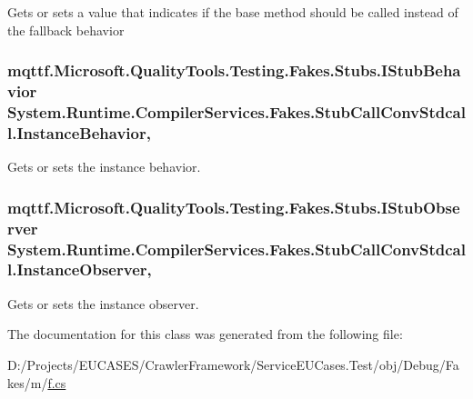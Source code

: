 Gets or sets a value that indicates if the base method should be called instead of the fallback behavior

\hypertarget{class_system_1_1_runtime_1_1_compiler_services_1_1_fakes_1_1_stub_call_conv_stdcall_a7f18e18bbdd66f56c6cda01beb3a7dd6}{
\subsubsection[{Instance\-Behavior}]{\setlength{\rightskip}{0pt plus 5cm}mqttf.\-Microsoft.\-Quality\-Tools.\-Testing.\-Fakes.\-Stubs.\-I\-Stub\-Behavior System.\-Runtime.\-Compiler\-Services.\-Fakes.\-Stub\-Call\-Conv\-Stdcall.\-Instance\-Behavior\hspace{0.3cm}{\ttfamily [get]}, {\ttfamily [set]}}}\label{class_system_1_1_runtime_1_1_compiler_services_1_1_fakes_1_1_stub_call_conv_stdcall_a7f18e18bbdd66f56c6cda01beb3a7dd6}


Gets or sets the instance behavior.

\hypertarget{class_system_1_1_runtime_1_1_compiler_services_1_1_fakes_1_1_stub_call_conv_stdcall_a0a7b11162d31c3da4751189d1c5eddc5}{
\subsubsection[{Instance\-Observer}]{\setlength{\rightskip}{0pt plus 5cm}mqttf.\-Microsoft.\-Quality\-Tools.\-Testing.\-Fakes.\-Stubs.\-I\-Stub\-Observer System.\-Runtime.\-Compiler\-Services.\-Fakes.\-Stub\-Call\-Conv\-Stdcall.\-Instance\-Observer\hspace{0.3cm}{\ttfamily [get]}, {\ttfamily [set]}}}\label{class_system_1_1_runtime_1_1_compiler_services_1_1_fakes_1_1_stub_call_conv_stdcall_a0a7b11162d31c3da4751189d1c5eddc5}


Gets or sets the instance observer.



The documentation for this class was generated from the following file\-:\begin{DoxyCompactItemize}
\item 
D\-:/\-Projects/\-E\-U\-C\-A\-S\-E\-S/\-Crawler\-Framework/\-Service\-E\-U\-Cases.\-Test/obj/\-Debug/\-Fakes/m/\hyperlink{m_2f_8cs}{f.\-cs}\end{DoxyCompactItemize}
